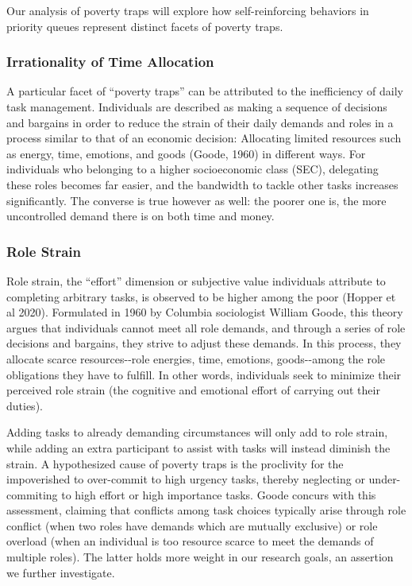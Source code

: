 Our analysis of poverty traps will explore how self-reinforcing
behaviors in priority queues represent distinct facets of poverty traps.

\hypertarget{irrationality-of-time-allocation}{%
\subsubsection{Irrationality of Time
Allocation}\label{irrationality-of-time-allocation}}

A particular facet of ``poverty traps'' can be attributed to the
inefficiency of daily task management. Individuals are described as
making a sequence of decisions and bargains in order to reduce the
strain of their daily demands and roles in a process similar to that of
an economic decision: Allocating limited resources such as energy, time,
emotions, and goods (Goode, 1960) in different ways. For individuals who
belonging to a higher socioeconomic class (SEC), delegating these roles
becomes far easier, and the bandwidth to tackle other tasks increases
significantly. The converse is true however as well: the poorer one is,
the more uncontrolled demand there is on both time and money.

\hypertarget{role-strain}{%
\subsubsection{Role Strain}\label{role-strain}}

Role strain, the ``effort'' dimension or subjective value individuals
attribute to completing arbitrary tasks, is observed to be higher among
the poor (Hopper et al 2020). Formulated in 1960 by Columbia sociologist
William Goode, this theory argues that individuals cannot meet all role
demands, and through a series of role decisions and bargains, they
strive to adjust these demands. In this process, they allocate scarce
resources-\/-role energies, time, emotions, goods-\/-among the role
obligations they have to fulfill. In other words, individuals seek to
minimize their perceived role strain (the cognitive and emotional effort
of carrying out their duties).

Adding tasks to already demanding circumstances will only add to role
strain, while adding an extra participant to assist with tasks will
instead diminish the strain. A hypothesized cause of poverty traps is
the proclivity for the impoverished to over-commit to high urgency
tasks, thereby neglecting or under-commiting to high effort or high
importance tasks. Goode concurs with this assessment, claiming that
conflicts among task choices typically arise through role conflict (when
two roles have demands which are mutually exclusive) or role overload
(when an individual is too resource scarce to meet the demands of
multiple roles). The latter holds more weight in our research goals, an
assertion we further investigate.

